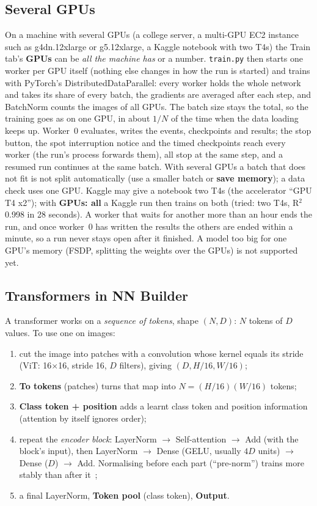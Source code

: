 \documentclass[11pt,a4paper]{article}
\newcommand{\ui}[1]{\textbf{\textsf{#1}}}
\newcommand{\file}[1]{\texttt{#1}}
\begin{document}
\subsection{Several GPUs}
\label{sec:multigpu}
On a machine with several GPUs (a college server, a multi-GPU EC2 instance such as g4dn.12xlarge or g5.12xlarge, a Kaggle notebook with
two T4s) the Train tab's \ui{GPUs} can be \emph{all the machine has} or a number. \file{train.py} then starts one worker per GPU itself
(nothing else changes in how the run is started) and trains with PyTorch's DistributedDataParallel: every worker holds the whole network
and takes its share of every batch, the gradients are averaged after each step, and BatchNorm counts the images of all GPUs. The batch
size stays the total, so the training goes as on one GPU, in about $1/N$ of the time when the data loading keeps up. Worker~0 evaluates,
writes the events, checkpoints and results; the stop button, the spot interruption notice and the timed checkpoints reach every worker
(the run's process forwards them), all stop at the same step, and a resumed run continues at the same batch. With several GPUs a batch
that does not fit is not split automatically (use a smaller batch or \ui{save memory}); a data check uses one GPU. Kaggle may give a
notebook two T4s (the accelerator ``GPU T4 x2''); with \ui{GPUs: all} a Kaggle run then trains on both (tried: two T4s, R$^2$ 0.998 in 28 seconds). A worker that waits for another more than an hour ends the run, and once
worker~0 has written the results the others are ended within a minute, so a run never stays open after it finished. A model too big for one GPU's
memory (FSDP, splitting the weights over the GPUs) is not supported yet.

\subsection{Transformers in NN Builder}
\label{sec:transformers}
A transformer works on a \emph{sequence of tokens}, shape $(N, D)$: $N$ tokens of $D$ values. To use one on images:
\begin{enumerate}
  \item cut the image into patches with a convolution whose kernel equals its stride (ViT: 16$\times$16, stride 16, $D$ filters), giving
        $(D, H/16, W/16)$;
  \item \ui{To tokens} (patches) turns that map into $N=(H/16)(W/16)$ tokens;
  \item \ui{Class token + position} adds a learnt class token and position information (attention by itself ignores order);
  \item repeat the \emph{encoder block}: LayerNorm $\rightarrow$ Self-attention $\rightarrow$ Add (with the block's input), then
        LayerNorm $\rightarrow$ Dense (GELU, usually $4D$ units) $\rightarrow$ Dense ($D$) $\rightarrow$ Add. Normalising before each
        part (``pre-norm'') trains more stably than after it~\cite{xiong2020prenorm};
  \item a final LayerNorm, \ui{Token pool} (class token), \ui{Output}.
\end{enumerate}
\end{document}

